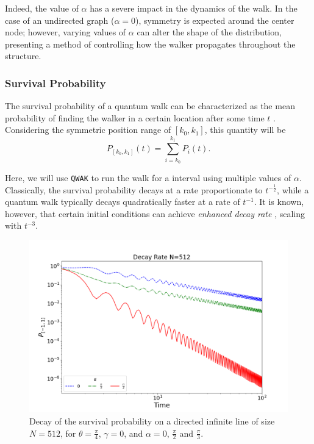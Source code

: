 \documentclass[main.tex]{subfiles}
\begin{document}
Indeed, the value of $\alpha$ has a severe impact in the dynamics of the walk.
In the case of an undirected graph ($\alpha = 0$), symmetry is expected around
the center node; however, varying values of $\alpha$ can alter the shape of the
distribution, presenting a method of controlling how the walker propagates
throughout the structure.

\subsubsection{Survival Probability}
The survival probability of a quantum walk can be characterized as the mean
probability of finding the walker in a certain location after some time $t$
\cite{Goenuelol2011}. Considering the symmetric position range of $[k_0,k_1]$, this
quantity will be
\begin{equation}
    P_{[k_0,k_1]}(t)=\sum_{i=k_0}^{k_1} P_{i}(t).
\end{equation}

Here, we will use \texttt{QWAK} to run the walk for a interval using multiple
values of $\alpha$. Classically, the survival probability decays at a rate
proportionate to $t^{-\frac{1}{2}}$, while a quantum walk typically decays
quadratically faster at a rate of $t^{-1}$. It is known, however, that certain
initial conditions can achieve \textit{enhanced decay rate}
\cite{abalEffects06}, scaling with $t^{-3}$.\par

\begin{figure}[!h]
    \centering
    \includegraphics[scale=\mysinglefigurescale]{img/QWAK/OrientedDecayRate/decMatrix512NW3_Alpha1.05-1.57S500TMAX100.png}
    \caption{Decay of the survival probability on a directed infinite line of
        size $N=512$, for $\theta =\frac{\pi}{4}$, $\gamma=0$, and $\alpha=0$,
        $\frac{\pi}{2}$ and $\frac{\pi}{3}$.}
    \label{fig:decay_rate_oriented_line}
\end{figure}
\end{document}
